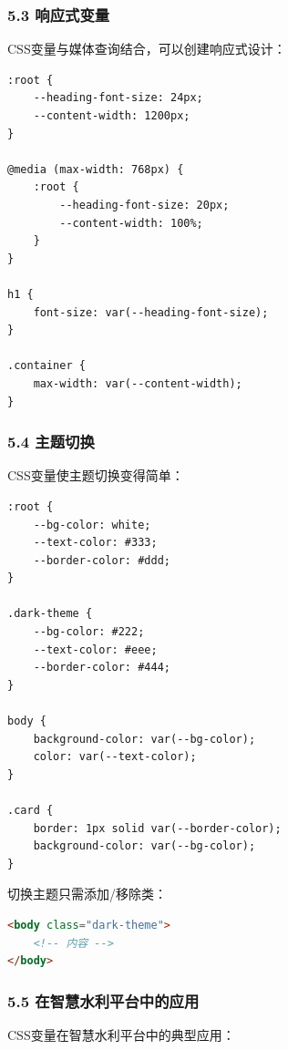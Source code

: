 \subsubsection{5.3 响应式变量}\label{ux54cdux5e94ux5f0fux53d8ux91cf}

CSS变量与媒体查询结合，可以创建响应式设计：

\begin{lstlisting}
:root {
    --heading-font-size: 24px;
    --content-width: 1200px;
}

@media (max-width: 768px) {
    :root {
        --heading-font-size: 20px;
        --content-width: 100%;
    }
}

h1 {
    font-size: var(--heading-font-size);
}

.container {
    max-width: var(--content-width);
}
\end{lstlisting}

\subsubsection{5.4 主题切换}\label{ux4e3bux9898ux5207ux6362}

CSS变量使主题切换变得简单：

\begin{lstlisting}
:root {
    --bg-color: white;
    --text-color: #333;
    --border-color: #ddd;
}

.dark-theme {
    --bg-color: #222;
    --text-color: #eee;
    --border-color: #444;
}

body {
    background-color: var(--bg-color);
    color: var(--text-color);
}

.card {
    border: 1px solid var(--border-color);
    background-color: var(--bg-color);
}
\end{lstlisting}

切换主题只需添加/移除类：

\begin{lstlisting}[language=HTML]
<body class="dark-theme">
    <!-- 内容 -->
</body>
\end{lstlisting}

\subsubsection{5.5
在智慧水利平台中的应用}\label{ux5728ux667aux6167ux6c34ux5229ux5e73ux53f0ux4e2dux7684ux5e94ux7528}

CSS变量在智慧水利平台中的典型应用：

